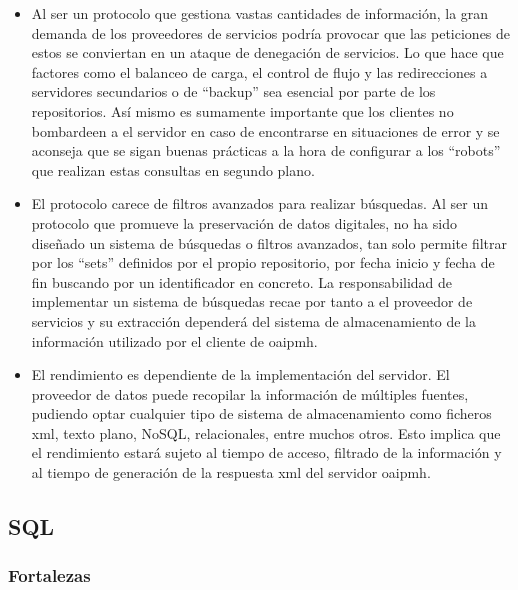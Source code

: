 \begin{itemize}
	\item Al ser un protocolo que gestiona vastas cantidades de información, la gran demanda de los proveedores de servicios podría provocar que las peticiones de estos se conviertan en un ataque de denegación de servicios. Lo que hace que factores como el balanceo de carga, el control de flujo y las redirecciones a servidores secundarios o de ``backup'' sea  esencial por parte de los repositorios. Así mismo es sumamente importante que los clientes no bombardeen a el servidor en caso de encontrarse en situaciones de error y se aconseja que se sigan buenas prácticas a la hora de configurar a los ``robots'' que realizan estas consultas en segundo plano.

	\item El protocolo carece de filtros avanzados para realizar búsquedas. Al ser un protocolo que promueve la preservación de datos digitales, no ha sido diseñado un sistema de búsquedas o filtros avanzados, tan solo permite filtrar por los ``sets'' definidos por el propio repositorio, por fecha inicio y fecha de fin buscando por un identificador en concreto. La responsabilidad de implementar un sistema de búsquedas recae por tanto a el proveedor de servicios y su extracción dependerá del sistema de almacenamiento de la información utilizado por el cliente de \acrshort{oaipmh}.

	\item El rendimiento es dependiente de la implementación del servidor. El proveedor de datos puede recopilar la información de múltiples fuentes, pudiendo optar cualquier tipo de sistema de almacenamiento como ficheros \acrshort{xml}, texto plano, NoSQL\cite{NoSQL},  relacionales, entre muchos otros. Esto implica que el rendimiento estará sujeto al tiempo de acceso, filtrado de la información y al tiempo de generación de la respuesta \acrshort{xml} del servidor \acrshort{oaipmh}.
\end{itemize}

\subsection{SQL}

\subsubsection{Fortalezas}

